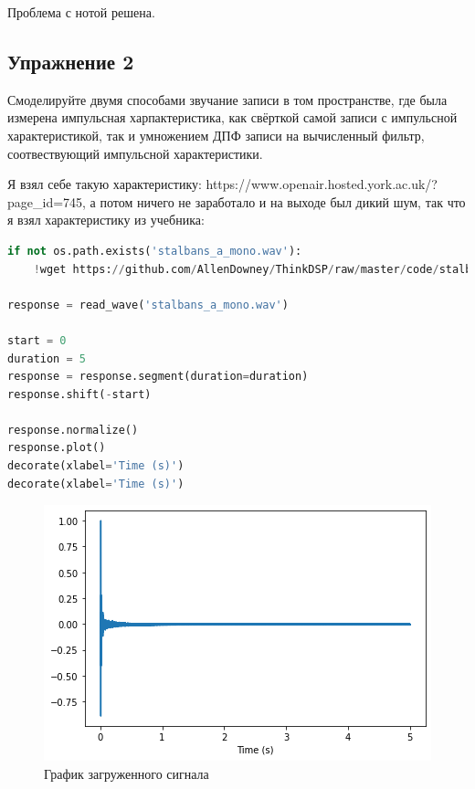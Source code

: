 Проблема с нотой решена.

\subsection{Упражнение 2}

Смоделируйте двумя способами звучание записи в том пространстве, где была измерена импульсная харпактеристика, как свёрткой самой записи с импульсной характеристикой, так и умножением ДПФ записи на вычисленный фильтр, соотвествующий импульсной характеристики.

\noindent Я взял себе такую характеристику: https://www.openair.hosted.york.ac.uk/?page\_id=745, а потом ничего не заработало и на выходе был дикий шум, так что я взял характеристику из учебника:

\begin{lstlisting}[language=Python]
if not os.path.exists('stalbans_a_mono.wav'):
    !wget https://github.com/AllenDowney/ThinkDSP/raw/master/code/stalbans_a_mono.wav

response = read_wave('stalbans_a_mono.wav')

start = 0
duration = 5
response = response.segment(duration=duration)
response.shift(-start)

response.normalize()
response.plot()
decorate(xlabel='Time (s)')
decorate(xlabel='Time (s)')
\end{lstlisting}
\begin{figure}[H]
	\begin{center}
		\includegraphics[scale=1]{fig/lab10/lab10_18_0.png}
		\caption{График загруженного сигнала}
	\end{center}
\end{figure}

